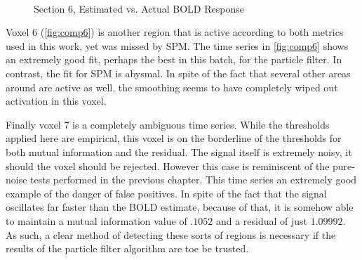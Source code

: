 \begin{figure}
\\
\caption{Section 6, Estimated vs. Actual BOLD Response}
\label{fig:comp7}
\end{figure}

Voxel 6 (\autoref{fig:comp6}) is another region that is active according to both metrics used
in this work, yet was missed by SPM. The time series in \autoref{fig:comp6} shows an extremely
good fit, perhaps the best in this batch, for the particle filter. In contrast, the
fit for SPM is abysmal. In spite of the fact that several other areas around are active
as well, the smoothing seems to have completely wiped out activation in this voxel. 

Finally voxel 7 is a completely ambiguous time series. While the thresholds applied here
are empirical, this voxel is on the borderline of the thresholds for both mutual information
and the residual. The signal itself is extremely noisy, it should the voxel should be rejected.
However this case is reminiscent of the pure-noise tests performed in the previous chapter. 
This time series an extremely good example of the danger of false positives. In spite of the
fact that the signal oscillates far faster than the BOLD estimate, because of that, it is somehow
able to maintain a mutual information value of $.1052$ and a residual of just $1.09992$.
As such, a clear method of detecting these sorts of regions is necessary if the results
of the particle filter algorithm are toe be trusted. 

